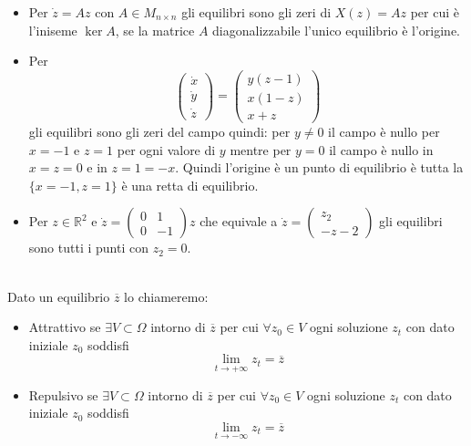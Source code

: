 \documentclass[11pt,a4paper,twoside]{book}
\newenvironment{definizione}[1][\empty]{\begin{Definizione}{
\ifx\empty#1\relax\else\mdseries\itshape#1\\\fi
}{}}{\end{Definizione}}
\newenvironment{esempio}[1][Esempio]{ 
  \begin{center}\begin{tcolorbox}[
  title={#1:\\},
  width=0.9\linewidth,
  flush right,
  enhanced jigsaw, 
  colback=white, 
  frame hidden, 
  sharpish corners, arc=3mm,
  borderline west = {1pt}{0pt}{gray},
  borderline south = {1pt}{0pt}{gray},
  coltitle=black, 
  fonttitle=\small\bfseries, 
  attach title to upper, 
  breakable,
  top=2.5pt, bottom=0.3pt]\small
  }{
 \normalsize \end{tcolorbox}\end{center}
}
\theoremstyle{esss}
\theoremstyle{dotless}
\numberwithin{equation}{section} %
\begin{document}
\begin{esempio}[Equilibri di alcuni sistemi elementari]
\begin{itemize}
\item Per $\dot{z}=Az$ con $A\in M_{n\times n}$ gli equilibri sono gli zeri di $X(z)=Az$ per cui è l'iniseme $\ker{A}$, se la matrice $A$ diagonalizzabile l'unico equilibrio è l'origine. 
\item Per \[
\left(\begin{array}{c}
\dot{x} \\ \dot{y} \\ \dot{z} \end{array}\right) = \left(\begin{array}{c}
y(z-1) \\ x (1-z) \\ x+z \end{array}\right)
\]
gli equilibri sono gli zeri del campo quindi: per $y\neq0$ il campo è nullo per $x=-1$ e $z=1$ per ogni valore di $y$ mentre per $y=0$ il campo è nullo in $x=z=0$ e in $z=1=-x$. Quindi l'origine è un punto di equilibrio è tutta la $\{x=-1,z=1\}$ è una retta di equilibrio.
\item Per $z\in\mathbb{R}^2$ e $\dot{z}=\left(\begin{array}{cc} 0 & 1 \\ 0 & -1 \end{array}\right)z$ che equivale a $\dot{z}=\left(\begin{array}{c}
z_2 \\ - z-2 \end{array}\right)$ gli equilibri sono tutti i punti con $z_2=0$. 
\end{itemize}
\end{esempio}

\begin{definizione}Dato un equilibrio $\overline{z}$ lo chiameremo:
\begin{itemize}
\item Attrattivo se $\exists V\subset\Omega$ intorno di $\overline{z}$ per cui $\forall z_0 \in V$ ogni soluzione $z_t$ con dato iniziale $z_0$ soddisfi \[\lim_{t\rightarrow +\infty} z_t=\overline{z} \]
\item Repulsivo se $\exists V\subset\Omega$ intorno di $\overline{z}$ per cui $\forall z_0 \in V$ ogni soluzione $z_t$ con dato iniziale $z_0$ soddisfi \[\lim_{t\rightarrow -\infty} z_t=\overline{z} \]
\end{itemize}
\end{definizione}
\end{document}
